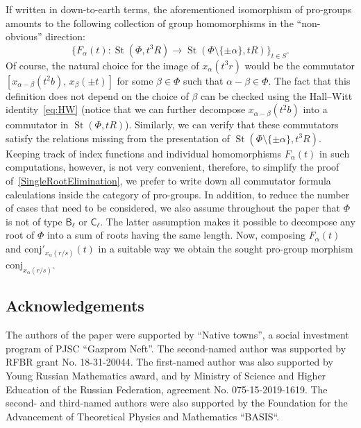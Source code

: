 \documentclass[oneside, 11pt]{amsart}
\numberwithin{equation}{section}
\theoremstyle{definition}
\theoremstyle{remark}
\DeclareMathOperator\St{St}
\newcommand{\rB}{\mathsf{B}}
\newcommand{\rC}{\mathsf{C}}
\begin{document}
If written in down-to-earth terms, the aforementioned isomorphism of pro-groups amounts to the following collection of group homomorphisms in the ``non-obvious'' direction:
\[\{F_\alpha(t)\colon \St(\Phi, t^3R)\rightarrow \St(\Phi\setminus\{\pm \alpha\}, tR) \}_{t\in S}.\]
Of course, the natural choice for the image of $x_\alpha(t^3r)$ would be the commutator  $[x_{\alpha-\beta}(t^2b),\,x_{\beta}(\pm t)]$ for some $\beta \in \Phi$ such that $\alpha-\beta\in \Phi$.
The fact that this definition does not depend on the choice of $\beta$ can be checked using the Hall--Witt identity~\eqref{eq:HW} (notice that we can further decompose $x_{\alpha-\beta}(t^2b)$ into a commutator in $\St(\Phi, tR)$).
Similarly, we can verify that these commutators satisfy the relations missing from the presentation of $\St(\Phi\setminus\{\pm\alpha\}, t^3R)$. Keeping track of index functions and individual homomorphisms $F_\alpha(t)$ in such computations, however, is not very convenient, therefore, to simplify the proof of~\cref{SingleRootElimination}, we prefer to write down all commutator formula calculations inside the category of pro-groups. In addition, to reduce the number of cases that need to be considered, we also assume throughout the paper that $\Phi$ is not of type $\rB_\ell$ or $\rC_\ell$. The latter assumption makes it possible to decompose any root of $\Phi$ into a sum of roots having the same length. Now, composing $F_\alpha(t)$ and $\mathrm{conj}'_{x_\alpha(r/s)}(t)$ in a suitable way we obtain the sought pro-group morphism $\mathrm{conj}_{x_\alpha(r/s)}$.

\subsection{Acknowledgements}
The authors of the paper were supported by ``Native towns'', a social investment program of PJSC ``Gazprom Neft''.
The second-named author was supported by RFBR grant No. 18-31-20044. 
The first-named author was also supported by Young Russian Mathematics award, and by Ministry of Science and Higher Education of the Russian Federation, agreement No. 075-15-2019-1619.
The second- and third-named authors were also supported by the Foundation for the Advancement of Theoretical Physics and Mathematics ``BASIS``.
\end{document}
